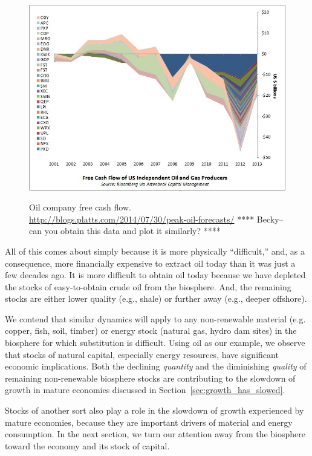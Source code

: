 \begin{figure}[!ht]
\centering\
\includegraphics[width=\linewidth]{Part_0/Chapter_Introduction/images/Cash-Flow.jpg}
\caption[Oil company free cash flow]{Oil company free cash flow.
\url{http://blogs.platts.com/2014/07/30/peak-oil-forecasts/}
**** Becky--can you obtain this data and plot it similarly? ****
}
\label{fig:oil_company_free_cash_flow}
\end{figure}

All of this comes about simply because it is 
more physically ``difficult,'' and, as a consequence, 
more financially expensive
to extract oil today than it was just a few decades ago.
It is more difficult to obtain oil today because we have depleted
the stocks of easy-to-obtain crude oil from the biosphere.
And, the remaining stocks are either lower quality (e.g., shale)
or further away (e.g., deeper offshore).

We contend that similar dynamics will apply to 
any non-renewable material (e.g. copper, fish, soil, timber) 
or energy stock (natural gas, hydro dam sites)
in the biosphere
for which substitution is difficult.
Using oil as our example, we observe that 
stocks of natural capital, especially energy resources,
have significant economic implications.
Both the declining \emph{quantity} and 
the diminishing \emph{quality} of remaining non-renewable biosphere stocks 
are contributing to the slowdown of growth in mature economies
discussed in Section~\ref{sec:growth_has_slowed}.

Stocks of another sort also play a role 
in the slowdown of growth experienced by mature economies,
because they  are important drivers of material and energy consumption.
In the next section, we turn our attention 
away from the biosphere 
toward the economy and its stock of capital.


